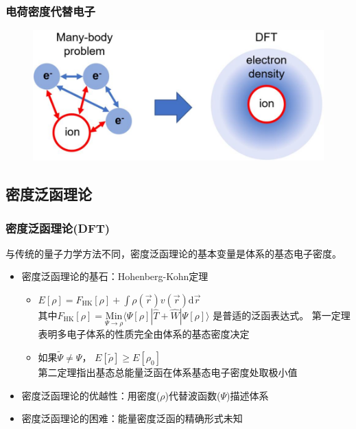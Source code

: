 \frame
{
	\frametitle{电荷密度代替电子}
\begin{figure}[h!]
\centering
\vspace{3.5pt}
\includegraphics[height=0.45\textwidth,width=1.0\textwidth,viewport=0 0 950 440,clip]{Figures/Schematic-illustration-of-transforming-many_electron-system-to-electron-density.png}
\caption{\fontsize{6.0pt}{4.5pt}}
\label{Density-Particle}
\end{figure}
}

\subsection{密度泛函理论}       %
\frame                               %
{
\frametitle{密度泛函理论(\textrm{DFT})} %
与传统的量子力学方法不同，密度泛函理论的基本变量是体系的基态电子密度。%
\begin{itemize}%
	\item 密度泛函理论的基石：\textrm{Hohenberg-Kohn}定理
\vskip 5pt
\begin{itemize}%
   \setlength{\itemsep}{8pt}
 \item $E[\rho]=F_{\mathrm{HK}}[\rho]+\displaystyle\int\rho(\vec{r})v(\vec{r})\textrm{d}\vec{r}$ \\
\vskip 5pt 其中$F_{\mathrm{HK}}[\rho]=\underset{\Psi\to\rho}{\mathrm{Min}}\langle\Psi[\rho]|\hat{T}+\hat{W}|\Psi[\rho]\rangle$
是普适的泛函表达式。%
     \textrm{\small{第一定理表明多电子体系的性质完全由体系的基态密度决定}}
   \item 如果$\tilde\Psi\neq\Psi$，
     $E[\tilde\rho]\geqslant E[\rho_0]$\\
     \textrm{\small{第二定理指出基态总能量泛函在体系基态电子密度处取极小值}}
   \end{itemize}
\vskip 8pt
 \item 密度泛函理论的优越性：用密度($\rho$)代替波函数($\Psi$)描述体系
\vskip 5pt
 \item 密度泛函理论的困难：能量密度泛函的精确形式未知
   \end{itemize}
}

